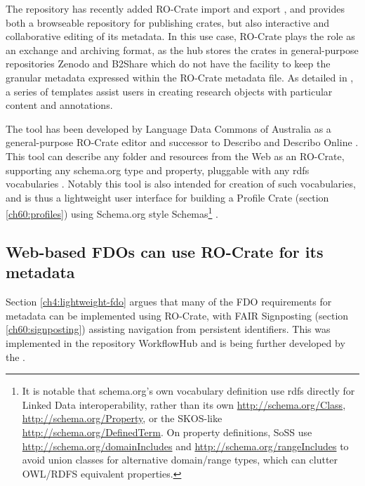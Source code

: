 The repository  \cite{ch5-48} has recently added RO-Crate import and export \cite{Fouilloux 2023}, and provides both a browseable repository for publishing crates, but also interactive and collaborative editing of its metadata. 
In this use case, RO-Crate plays the role as an exchange and archiving format, as the hub stores the crates in general-purpose repositories Zenodo and B2Share which do not have the facility to keep the granular metadata expressed within the RO-Crate metadata file. As detailed in \cite{Fouilloux 2023}, a series of templates assist users in creating research objects with particular content and annotations. 

The  tool has been developed by Language Data Commons of Australia  as a general-purpose RO-Crate editor and successor to Describo \cite{ch5-78} and Describo Online \cite{ch5-77}. 
This tool can describe any folder and resources from the Web as an RO-Crate, supporting any schema.org type and property, pluggable with any rdfs vocabularies \cite{w3-rdf-schema}. 
Notably this tool is also intended for creation of such vocabularies, and is thus a lightweight user interface for building a Profile Crate (section \vref{ch60:profiles}) using Schema.org style Schemas\footnote{
  It is notable that schema.org's own vocabulary definition use rdfs directly for Linked Data interoperability, 
  rather than its own \url{http://schema.org/Class}, \url{http://schema.org/Property}, or the SKOS-like \url{http://schema.org/DefinedTerm}. 
  On property definitions, SoSS use \url{http://schema.org/domainIncludes} and \url{http://schema.org/rangeIncludes} to avoid union classes for alternative domain/range types, which can clutter OWL/RDFS equivalent properties.} 
.


\subsection{Web-based FDOs can use RO-Crate for its metadata}

Section \vref{ch4:lightweight-fdo} argues that many of the FDO requirements \cite{fdo-RequirementSpec} for metadata can be implemented using RO-Crate, with FAIR Signposting (section \vref{ch60:signposting}) assisting navigation from persistent identifiers. This was implemented in the repository WorkflowHub \cite{wittenburgFAIRDigitalObject2022b} and is being further developed by the  \cite{10.5281/zenodo.7152762}.

